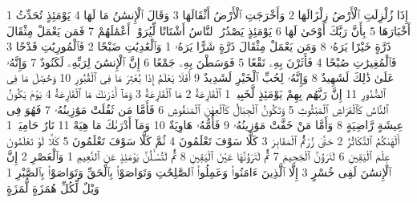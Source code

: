 {\tiny\colorbox{cl_aya}{1}} إِذَا زُلْزِلَتِ ٱلْأَرْضُ زِلْزَالَهَا
{\tiny\colorbox{cl_aya}{2}} وَأَخْرَجَتِ ٱلْأَرْضُ أَثْقَالَهَا
{\tiny\colorbox{cl_aya}{3}} وَقَالَ ٱلْإِنسَٰنُ مَا لَهَا
{\tiny\colorbox{cl_aya}{4}} يَوْمَئِذٍ تُحَدِّثُ أَخْبَارَهَا
{\tiny\colorbox{cl_aya}{5}} بِأَنَّ رَبَّكَ أَوْحَىٰ لَهَا
{\tiny\colorbox{cl_aya}{6}} يَوْمَئِذٍ يَصْدُرُ ٱلنَّاسُ أَشْتَاتًا لِّيُرَوْا۟ أَعْمَٰلَهُمْ
{\tiny\colorbox{cl_aya}{7}} فَمَن يَعْمَلْ مِثْقَالَ ذَرَّةٍ خَيْرًا يَرَهُۥ
{\tiny\colorbox{cl_aya}{8}} وَمَن يَعْمَلْ مِثْقَالَ ذَرَّةٍ شَرًّا يَرَهُۥ
{\tiny\colorbox{cl_aya}{1}} وَٱلْعَٰدِيَٰتِ ضَبْحًا
{\tiny\colorbox{cl_aya}{2}} فَٱلْمُورِيَٰتِ قَدْحًا
{\tiny\colorbox{cl_aya}{3}} فَٱلْمُغِيرَٰتِ صُبْحًا
{\tiny\colorbox{cl_aya}{4}} فَأَثَرْنَ بِهِۦ نَقْعًا
{\tiny\colorbox{cl_aya}{5}} فَوَسَطْنَ بِهِۦ جَمْعًا
{\tiny\colorbox{cl_aya}{6}} إِنَّ ٱلْإِنسَٰنَ لِرَبِّهِۦ لَكَنُودٌ
{\tiny\colorbox{cl_aya}{7}} وَإِنَّهُۥ عَلَىٰ ذَٰلِكَ لَشَهِيدٌ
{\tiny\colorbox{cl_aya}{8}} وَإِنَّهُۥ لِحُبِّ ٱلْخَيْرِ لَشَدِيدٌ
{\tiny\colorbox{cl_aya}{9}} أَفَلَا يَعْلَمُ إِذَا بُعْثِرَ مَا فِى ٱلْقُبُورِ
{\tiny\colorbox{cl_aya}{10}} وَحُصِّلَ مَا فِى ٱلصُّدُورِ
{\tiny\colorbox{cl_aya}{11}} إِنَّ رَبَّهُم بِهِمْ يَوْمَئِذٍ لَّخَبِيرٌۢ
{\tiny\colorbox{cl_aya}{1}} ٱلْقَارِعَةُ
{\tiny\colorbox{cl_aya}{2}} مَا ٱلْقَارِعَةُ
{\tiny\colorbox{cl_aya}{3}} وَمَآ أَدْرَىٰكَ مَا ٱلْقَارِعَةُ
{\tiny\colorbox{cl_aya}{4}} يَوْمَ يَكُونُ ٱلنَّاسُ كَٱلْفَرَاشِ ٱلْمَبْثُوثِ
{\tiny\colorbox{cl_aya}{5}} وَتَكُونُ ٱلْجِبَالُ كَٱلْعِهْنِ ٱلْمَنفُوشِ
{\tiny\colorbox{cl_aya}{6}} فَأَمَّا مَن ثَقُلَتْ مَوَٰزِينُهُۥ
{\tiny\colorbox{cl_aya}{7}} فَهُوَ فِى عِيشَةٍ رَّاضِيَةٍ
{\tiny\colorbox{cl_aya}{8}} وَأَمَّا مَنْ خَفَّتْ مَوَٰزِينُهُۥ
{\tiny\colorbox{cl_aya}{9}} فَأُمُّهُۥ هَاوِيَةٌ
{\tiny\colorbox{cl_aya}{10}} وَمَآ أَدْرَىٰكَ مَا هِيَهْ
{\tiny\colorbox{cl_aya}{11}} نَارٌ حَامِيَةٌۢ
{\tiny\colorbox{cl_aya}{1}} أَلْهَىٰكُمُ ٱلتَّكَاثُرُ
{\tiny\colorbox{cl_aya}{2}} حَتَّىٰ زُرْتُمُ ٱلْمَقَابِرَ
{\tiny\colorbox{cl_aya}{3}} كَلَّا سَوْفَ تَعْلَمُونَ
{\tiny\colorbox{cl_aya}{4}} ثُمَّ كَلَّا سَوْفَ تَعْلَمُونَ
{\tiny\colorbox{cl_aya}{5}} كَلَّا لَوْ تَعْلَمُونَ عِلْمَ ٱلْيَقِينِ
{\tiny\colorbox{cl_aya}{6}} لَتَرَوُنَّ ٱلْجَحِيمَ
{\tiny\colorbox{cl_aya}{7}} ثُمَّ لَتَرَوُنَّهَا عَيْنَ ٱلْيَقِينِ
{\tiny\colorbox{cl_aya}{8}} ثُمَّ لَتُسْـَٔلُنَّ يَوْمَئِذٍ عَنِ ٱلنَّعِيمِ
{\tiny\colorbox{cl_aya}{1}} وَٱلْعَصْرِ
{\tiny\colorbox{cl_aya}{2}} إِنَّ ٱلْإِنسَٰنَ لَفِى خُسْرٍ
{\tiny\colorbox{cl_aya}{3}} إِلَّا ٱلَّذِينَ ءَامَنُوا۟ وَعَمِلُوا۟ ٱلصَّٰلِحَٰتِ وَتَوَاصَوْا۟ بِٱلْحَقِّ وَتَوَاصَوْا۟ بِٱلصَّبْرِ
{\tiny\colorbox{cl_aya}{1}} وَيْلٌ لِّكُلِّ هُمَزَةٍ لُّمَزَةٍ
